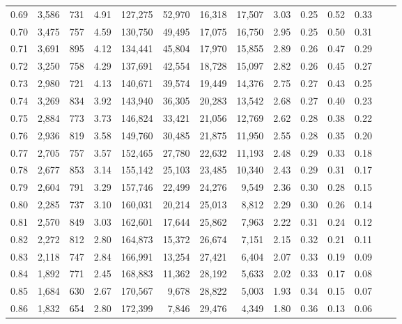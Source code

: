 \begin{tabular}{rrrrrrrrrrrrrr}
0.69 &  3,586 &  731 &    4.91 &  127,275 &   52,970 &  16,318 &  17,507 &  3.03 &  0.25 &  0.52 &      0.33 \\
0.70 &  3,475 &  757 &    4.59 &  130,750 &   49,495 &  17,075 &  16,750 &  2.95 &  0.25 &  0.50 &      0.31 \\
0.71 &  3,691 &  895 &    4.12 &  134,441 &   45,804 &  17,970 &  15,855 &  2.89 &  0.26 &  0.47 &      0.29 \\
0.72 &  3,250 &  758 &    4.29 &  137,691 &   42,554 &  18,728 &  15,097 &  2.82 &  0.26 &  0.45 &      0.27 \\
0.73 &  2,980 &  721 &    4.13 &  140,671 &   39,574 &  19,449 &  14,376 &  2.75 &  0.27 &  0.43 &      0.25 \\
0.74 &  3,269 &  834 &    3.92 &  143,940 &   36,305 &  20,283 &  13,542 &  2.68 &  0.27 &  0.40 &      0.23 \\
0.75 &  2,884 &  773 &    3.73 &  146,824 &   33,421 &  21,056 &  12,769 &  2.62 &  0.28 &  0.38 &      0.22 \\
0.76 &  2,936 &  819 &    3.58 &  149,760 &   30,485 &  21,875 &  11,950 &  2.55 &  0.28 &  0.35 &      0.20 \\
0.77 &  2,705 &  757 &    3.57 &  152,465 &   27,780 &  22,632 &  11,193 &  2.48 &  0.29 &  0.33 &      0.18 \\
0.78 &  2,677 &  853 &    3.14 &  155,142 &   25,103 &  23,485 &  10,340 &  2.43 &  0.29 &  0.31 &      0.17 \\
0.79 &  2,604 &  791 &    3.29 &  157,746 &   22,499 &  24,276 &   9,549 &  2.36 &  0.30 &  0.28 &      0.15 \\
0.80 &  2,285 &  737 &    3.10 &  160,031 &   20,214 &  25,013 &   8,812 &  2.29 &  0.30 &  0.26 &      0.14 \\
0.81 &  2,570 &  849 &    3.03 &  162,601 &   17,644 &  25,862 &   7,963 &  2.22 &  0.31 &  0.24 &      0.12 \\
0.82 &  2,272 &  812 &    2.80 &  164,873 &   15,372 &  26,674 &   7,151 &  2.15 &  0.32 &  0.21 &      0.11 \\
0.83 &  2,118 &  747 &    2.84 &  166,991 &   13,254 &  27,421 &   6,404 &  2.07 &  0.33 &  0.19 &      0.09 \\
0.84 &  1,892 &  771 &    2.45 &  168,883 &   11,362 &  28,192 &   5,633 &  2.02 &  0.33 &  0.17 &      0.08 \\
0.85 &  1,684 &  630 &    2.67 &  170,567 &    9,678 &  28,822 &   5,003 &  1.93 &  0.34 &  0.15 &      0.07 \\
0.86 &  1,832 &  654 &    2.80 &  172,399 &    7,846 &  29,476 &   4,349 &  1.80 &  0.36 &  0.13 &      0.06 \\

\end{tabular}
